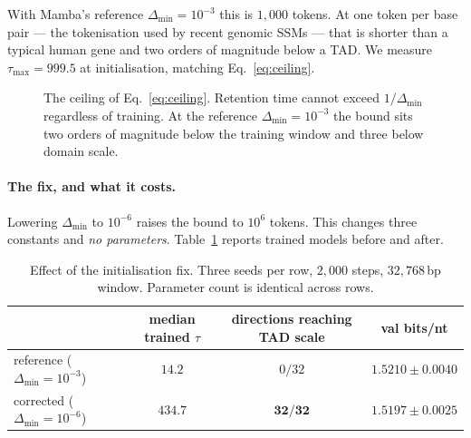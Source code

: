 \documentclass[10pt]{article}
\begin{document}
With Mamba's reference $\Delta_{\min} = 10^{-3}$ this is $1{,}000$ tokens. At
one token per base pair --- the tokenisation used by recent genomic SSMs --- that
is shorter than a typical human gene and two orders of magnitude below a TAD. We
measure $\tau_{\max} = 999.5$ at initialisation, matching
Eq.~\eqref{eq:ceiling}.

\begin{figure}[t]
\centering
{}
\caption{The ceiling of Eq.~\eqref{eq:ceiling}. Retention time cannot exceed
$1/\Delta_{\min}$ regardless of training. At the reference
$\Delta_{\min}=10^{-3}$ the bound sits two orders of magnitude below the
training window and three below domain scale.}
\label{fig:ceiling}
\end{figure}

\paragraph{The fix, and what it costs.}
Lowering $\Delta_{\min}$ to $10^{-6}$ raises the bound to $10^{6}$ tokens. This
changes three constants and \emph{no parameters}. Table~\ref{tab:f4} reports
trained models before and after.

\begin{table}[t]
\centering\small
\caption{Effect of the initialisation fix. Three seeds per row, $2{,}000$ steps,
$32{,}768$\,bp window. Parameter count is identical across rows.}
\label{tab:f4}
\begin{tabular}{lccc}
\toprule
 & median trained $\tau$ & directions reaching TAD scale & val bits/nt \\
\midrule
reference ($\Delta_{\min}=10^{-3}$) & $14.2$ & $0/32$ & $1.5210 \pm 0.0040$ \\
corrected ($\Delta_{\min}=10^{-6}$) & $\mathbf{434.7}$ & $\mathbf{32/32}$ & $1.5197 \pm 0.0025$ \\
\bottomrule
\end{tabular}
\end{table}
\end{document}
